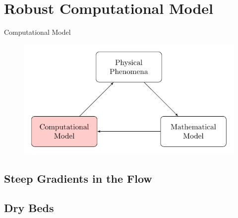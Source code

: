\documentclass[pdf]{beamer}
\begin{document}
\section{Robust Computational Model}

\begin{frame}{Computational Model}
	\begin{figure}
		\includegraphics[width=\textwidth]{./Pics/ModelDiagrams/FlowChartHigh3.pdf}
	\end{figure}
\end{frame}
\subsection{Steep Gradients in the Flow}
\begin{frame}
\end{frame}
\subsection{Dry Beds}
\begin{frame}
\end{frame}
\end{document}
